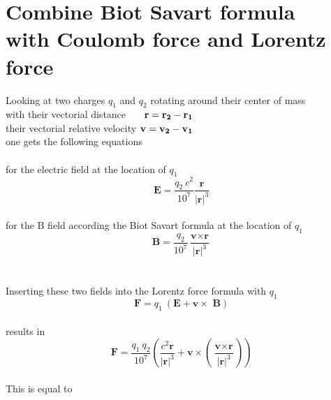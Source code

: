 \documentclass[10pt,titlepage]{article}
\begin{document}
\section{Combine Biot Savart formula \\with Coulomb force and Lorentz force}
Looking at two charges $q_1$ and $q_2$ rotating around their center of mass
\\
with their vectorial distance \ \ \ ${\bf r=r_2-r_1}$
\\
their vectorial relative velocity ${ \bf v = v_2-v_1}$
\\
one gets the following equations\\\\
for the electric field at the location of $q_1$
\begin{equation}
\textbf{E} = \frac{ q_2 \ c^2}{10^7}\frac{\textbf{r}}{\vert\textbf{r}\vert^3}
\end{equation}\\
for the B field according the Biot Savart formula at the location of $q_1$
\begin{equation}
\textbf{B} = \frac{q_2}{10^7} \frac{\textbf{v} \times \textbf{r}}{\vert\textbf{r}\vert^3}
\end{equation}
\\\\
Inserting these two fields into the Lorentz force formula with $q_1$ 
\begin{equation}
\textbf{F} = q_1 \ (\textbf{E}+\textbf{v}\times \textbf{ B})
\end{equation}
\\
results in
\begin{equation}
\textbf{F} = \frac{{q_1} \ {q_2}}{{10^7}}( \frac{c^2\textbf{r}}{\vert\textbf{r}\vert^3}+\textbf{v}\times ( \frac{\textbf{v} \times  \textbf{r}}{\vert\textbf{r}\vert^3}))
\end{equation}\\
This is equal to
\end{document}
